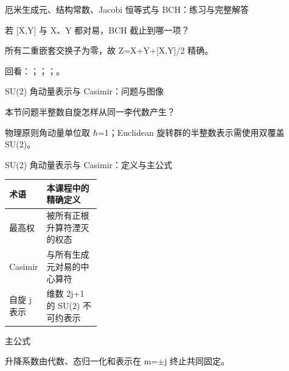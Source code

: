 \begin{frame}[t]{厄米生成元、结构常数、Jacobi 恒等式与 BCH：练习与完整解答}
\footnotesize
\begin{block}{}若 [X,Y] 与 X、Y 都对易，BCH 截止到哪一项？\end{block}
\begin{exampleblock}{}所有二重嵌套交换子为零，故 Z=X+Y+[X,Y]/\allowbreak{}2 精确。\end{exampleblock}
\vfill
\scriptsize 回看：；；；。
\end{frame}

\begin{frame}[t]{SU(2) 角动量表示与 Casimir：问题与图像}
\footnotesize
\begin{block}{本节问题}半整数自旋怎样从同一李代数产生？\end{block}
\begin{block}{物理原则}\quad 角动量单位取 \ensuremath{\hbar}=1；Euclidean 旋转群的半整数表示需使用双覆盖 SU(2)。\end{block}
\end{frame}

\begin{frame}[t]{SU(2) 角动量表示与 Casimir：定义与主公式}
\footnotesize\begin{tabularx}{\linewidth}{p{0.30\linewidth}Y}
\toprule 术语 & 本课程中的精确定义\\\midrule
{} 最高权 & 被所有正根升算符湮灭的权态\\
 Casimir & 与所有生成元对易的中心算符\\
 自旋 j 表示 & 维数 2j+1 的 SU(2) 不可约表示\\
\bottomrule\end{tabularx}\vspace{0.15cm}
\begin{block}{ 主公式}\centering{}\end{block}
升降系数由代数、态归一化和表示在 m=\ensuremath{\pm}j 终止共同固定。
\end{frame}

